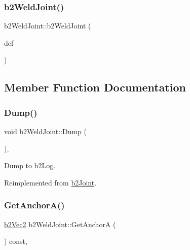 \subsubsection{\texorpdfstring{b2WeldJoint()}{b2WeldJoint()}}
{\footnotesize\ttfamily b2\+Weld\+Joint\+::b2\+Weld\+Joint (\begin{DoxyParamCaption}\item[{const \mbox{\hyperlink{structb2_weld_joint_def}{b2\+Weld\+Joint\+Def}} $\ast$}]{def }\end{DoxyParamCaption})\hspace{0.3cm}{\ttfamily [protected]}}



\subsection{Member Function Documentation}
\mbox{\label{classb2_weld_joint_a59de1cad3229b41886bc23c4d6216e2f}} 
\subsubsection{\texorpdfstring{Dump()}{Dump()}}
{\footnotesize\ttfamily void b2\+Weld\+Joint\+::\+Dump (\begin{DoxyParamCaption}{ }\end{DoxyParamCaption})\hspace{0.3cm}{\ttfamily [override]}, {\ttfamily [virtual]}}



Dump to b2\+Log. 



Reimplemented from \mbox{\hyperlink{classb2_joint_abd35e7316017ad9a40d5dbf9b5ba3f36}{b2\+Joint}}.

\mbox{\label{classb2_weld_joint_ac675d0b09a4d9567d85bcba8821785bc}} 
\subsubsection{\texorpdfstring{GetAnchorA()}{GetAnchorA()}}
{\footnotesize\ttfamily \mbox{\hyperlink{structb2_vec2}{b2\+Vec2}} b2\+Weld\+Joint\+::\+Get\+AnchorA (\begin{DoxyParamCaption}{ }\end{DoxyParamCaption}) const\hspace{0.3cm}{\ttfamily [override]}, {\ttfamily [virtual]}}



